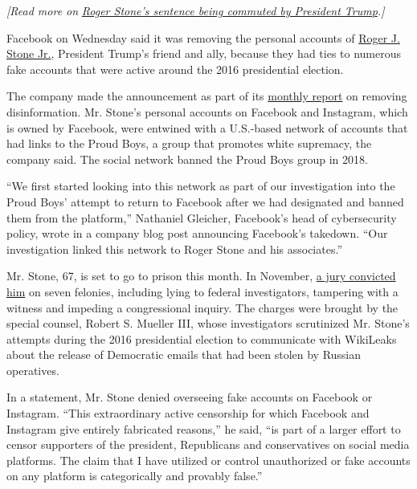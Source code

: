\emph{{[}Read more on}
\href{https://www.nytimes.com/2020/07/10/us/politics/trump-roger-stone-clemency.html}{\emph{Roger
Stone's sentence being commuted by President Trump}}\emph{.{]}}

Facebook on Wednesday said it was removing the personal accounts of
\href{https://www.nytimes.com/2020/07/19/us/politics/roger-stone-mo-kelly-slur.html}{Roger
J. Stone Jr.}, President Trump's friend and ally, because they had ties
to numerous fake accounts that were active around the 2016 presidential
election.

The company made the announcement as part of its
\href{https://about.fb.com/news/2020/07/removing-political-coordinated-inauthentic-behavior/}{monthly
report} on removing disinformation. Mr. Stone's personal accounts on
Facebook and Instagram, which is owned by Facebook, were entwined with a
U.S.-based network of accounts that had links to the Proud Boys, a group
that promotes white supremacy, the company said. The social network
banned the Proud Boys group in 2018.

``We first started looking into this network as part of our
investigation into the Proud Boys' attempt to return to Facebook after
we had designated and banned them from the platform,'' Nathaniel
Gleicher, Facebook's head of cybersecurity policy, wrote in a company
blog post announcing Facebook's takedown. ``Our investigation linked
this network to Roger Stone and his associates.''

Mr. Stone, 67, is set to go to prison this month. In November,
\href{https://www.nytimes.com/2019/11/15/us/politics/roger-stone-trial-guilty.html}{a
jury convicted him} on seven felonies, including lying to federal
investigators, tampering with a witness and impeding a congressional
inquiry. The charges were brought by the special counsel, Robert S.
Mueller III, whose investigators scrutinized Mr. Stone's attempts during
the 2016 presidential election to communicate with WikiLeaks about the
release of Democratic emails that had been stolen by Russian operatives.

In a statement, Mr. Stone denied overseeing fake accounts on Facebook or
Instagram. ``This extraordinary active censorship for which Facebook and
Instagram give entirely fabricated reasons,'' he said, ``is part of a
larger effort to censor supporters of the president, Republicans and
conservatives on social media platforms. The claim that I have utilized
or control unauthorized or fake accounts on any platform is
categorically and provably false.''

